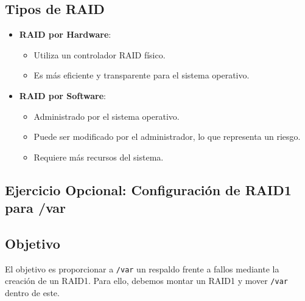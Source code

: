 \subsection{Tipos de RAID}
\begin{itemize}
    \item \textbf{RAID por Hardware}: 
    \begin{itemize}
        \item Utiliza un controlador RAID físico.
        \item Es más eficiente y transparente para el sistema operativo.
    \end{itemize}
    
    \item \textbf{RAID por Software}: 
    \begin{itemize}
        \item Administrado por el sistema operativo.
        \item Puede ser modificado por el administrador, lo que representa un riesgo.
        \item Requiere más recursos del sistema.
    \end{itemize}
\end{itemize}

\subsection{Ejercicio Opcional: Configuración de RAID1 para /var}

\subsection{Objetivo}
El objetivo es proporcionar a \texttt{/var} un respaldo frente a fallos mediante la creación de un RAID1. Para ello, debemos montar un RAID1 y mover \texttt{/var} dentro de este.


